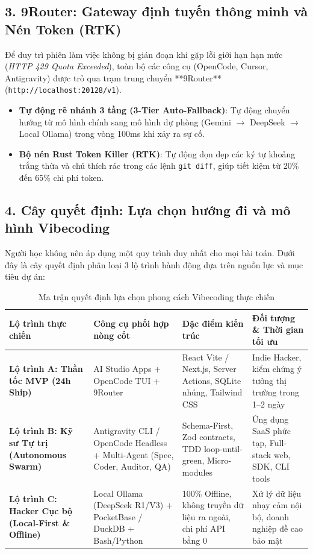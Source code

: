 \documentclass[a4paper,11pt]{article}
\begin{document}
\subsection{3. 9Router: Gateway định tuyến thông minh và Nén Token (RTK)}
Để duy trì phiên làm việc không bị gián đoạn khi gặp lỗi giới hạn hạn mức (\textit{HTTP 429 Quota Exceeded}), toàn bộ các công cụ (OpenCode, Cursor, Antigravity) được trỏ qua trạm trung chuyển **9Router** (\texttt{http://localhost:20128/v1}). 
\begin{itemize}[leftmargin=1.5em]
    \item \textbf{Tự động rẽ nhánh 3 tầng (3-Tier Auto-Fallback)}: Tự động chuyển hướng từ mô hình chính sang mô hình dự phòng (Gemini $\rightarrow$ DeepSeek $\rightarrow$ Local Ollama) trong vòng 100ms khi xảy ra sự cố.
    \item \textbf{Bộ nén Rust Token Killer (RTK)}: Tự động dọn dẹp các ký tự khoảng trắng thừa và chú thích rác trong các lệnh \texttt{git diff}, giúp tiết kiệm từ 20\% đến 65\% chi phí token.
\end{itemize}

\subsection{4. Cây quyết định: Lựa chọn hướng đi và mô hình Vibecoding}

Người học không nên áp dụng một quy trình duy nhất cho mọi bài toán. Dưới đây là cây quyết định phân loại 3 lộ trình hành động dựa trên nguồn lực và mục tiêu dự án:

\begin{table}[htbp]
\centering
\small
\caption{Ma trận quyết định lựa chọn phong cách Vibecoding thực chiến}
\vspace{0.5em}
\begin{tabularx}{\textwidth}{L{3.2cm} L{3.8cm} L{4.5cm} Y}
\toprule
\textbf{Lộ trình thực chiến} & \textbf{Công cụ phối hợp nòng cốt} & \textbf{Đặc điểm kiến trúc} & \textbf{Đối tượng \& Thời gian tối ưu} \\
\midrule
\textbf{Lộ trình A: Thần tốc MVP (24h Ship)} & AI Studio Apps + OpenCode TUI + 9Router & React Vite / Next.js, Server Actions, SQLite nhúng, Tailwind CSS & Indie Hacker, kiểm chứng ý tưởng thị trường trong 1--2 ngày \\
\textbf{Lộ trình B: Kỹ sư Tự trị (Autonomous Swarm)} & Antigravity CLI / OpenCode Headless + Multi-Agent (Spec, Coder, Auditor, QA) & Schema-First, Zod contracts, TDD loop-until-green, Micro-modules & Ứng dụng SaaS phức tạp, Full-stack web, SDK, CLI tools \\
\textbf{Lộ trình C: Hacker Cục bộ (Local-First \& Offline)} & Local Ollama (DeepSeek R1/V3) + PocketBase / DuckDB + Bash/Python & 100\% Offline, không truyền dữ liệu ra ngoài, chi phí API bằng 0 & Xử lý dữ liệu nhạy cảm nội bộ, doanh nghiệp đề cao bảo mật \\
\bottomrule
\end{tabularx}
\end{table}
\end{document}
